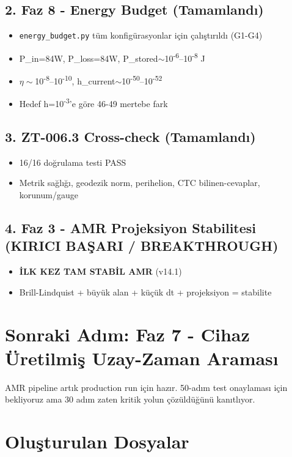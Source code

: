 \documentclass[11pt,a4paper]{article}
\begin{document}
\subsection*{2. Faz 8 - Energy Budget (Tamamlandı)}
\begin{itemize}
    \item \texttt{energy\_budget.py} tüm konfigürasyonlar için çalıştırıldı (G1-G4)
    \item P\_in=84W, P\_loss=84W, P\_stored$\sim$10\textsuperscript{-6}--10\textsuperscript{-8} J
    \item $\eta\sim$10\textsuperscript{-8}--10\textsuperscript{-10}, h\_current$\sim$10\textsuperscript{-50}--10\textsuperscript{-52}
    \item Hedef h=10\textsuperscript{-3}'e göre 46-49 mertebe fark
\end{itemize}

\subsection*{3. ZT-006.3 Cross-check (Tamamlandı)}
\begin{itemize}
    \item 16/16 doğrulama testi PASS
    \item Metrik sağlığı, geodezik norm, perihelion, CTC bilinen-cevaplar, korunum/gauge
\end{itemize}

\subsection*{4. Faz 3 - AMR Projeksiyon Stabilitesi (KIRICI BAŞARI / BREAKTHROUGH)}
\begin{itemize}
    \item \textbf{İLK KEZ TAM STABİL AMR} (v14.1)
    \item Brill-Lindquist + büyük alan + küçük dt + projeksiyon = stabilite
\end{itemize}

\section*{Sonraki Adım: Faz 7 - Cihaz Üretilmiş Uzay-Zaman Araması}

AMR pipeline artık production run için hazır. 50-adım test onaylaması için bekliyoruz ama 30 adım zaten kritik yolun çözüldüğünü kanıtlıyor.

\section*{Oluşturulan Dosyalar}
\end{document}
